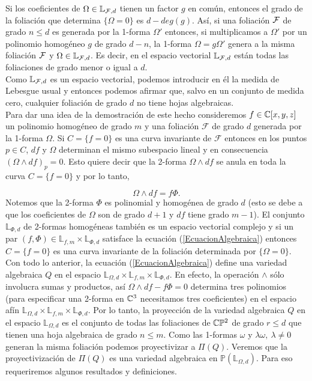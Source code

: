 Si los coeficientes de $\Omega\in\mathbb{L}_{\mathcal{F},d}$ tienen un factor $g$ en común, entonces el grado de la foliación que determina $\{\Omega =0\}$ es $d-deg(g)$. Así, si una foliación $\mathcal{F}$ de grado $n\leq d$ es generada por la 1-forma $\Omega'$ entonces, si multiplicamos a $\Omega'$ por un polinomio homogéneo $g$ de grado $d-n$, la 1-forma $\Omega=g\Omega'$ genera a la misma foliación $\mathcal{F}$ y $\Omega\in\mathbb{L}_{\mathcal{F},d}$. Es decir, en el espacio vectorial $\mathbb{L}_{\mathcal{F},d}$ están todas las foliaciones de grado menor o igual a $d$.\\

Como $\mathbb{L}_{\mathcal{F},d}$ es un espacio vectorial, podemos introducir en él la medida de Lebesgue usual y entonces podemos afirmar que, salvo en un conjunto de medida cero, cualquier foliación de grado $d$ no tiene hojas algebraicas.\\

Para dar una idea de la demostración de este hecho consideremos $f\in\mathbb{C}[x,y,z]$ un polinomio homogéneo  de grado $m$  y una foliación $\mathcal{F}$ de grado $d$ generada por la 1-forma $\Omega$. Si $C=\{f=0\}$ es una curva invariante de $\mathcal{F}$ entonces en los puntos $p\in C$, $df$ y $\Omega$ determinan el mismo subespacio lineal y en consecuencia $(\Omega\wedge df)_{p}=0$. Esto quiere decir que la 2-forma $\Omega\wedge df$ se anula en toda la curva $C=\{f=0\}$ y por lo tanto,

\begin{equation}
\label{EcuacionAlgebraica} 
\Omega\wedge df=f\Phi.
\end{equation}
\noindent Notemos que la 2-forma $\Phi$ es polinomial y homogénea de grado $d$ (esto se debe a que los coeficientes de $\Omega$ son de grado $d+1$ y $df$ tiene grado $m-1$). El conjunto $\mathbb{L}_{\Phi,d}$ de 2-formas homogéneas también es un espacio vectorial complejo y si un par $(f,\Phi)\in\mathbb{L}_{f,m}\times\mathbb{L}_{\Phi,d}$ satisface la ecuación (\ref{EcuacionAlgebraica}) entonces $C=\{f=0\}$ es una curva invariante de la foliación determinada por $\{\Omega=0\}$.\\

Con todo lo anterior, la ecuación (\ref{EcuacionAlgebraica}) define una variedad algebraica $Q$ en el espacio $\mathbb{L}_{\Omega,d}\times\mathbb{L}_{f,m}\times\mathbb{L}_{\Phi,d}$. En efecto, la operación $\wedge$ sólo involucra sumas y productos, así $\Omega\wedge df-f\Phi=0$ determina tres polinomios (para especificar una 2-forma en $\mathbb{C}^{3}$ necesitamos tres coeficientes) en el espacio afín $\mathbb{L}_{\Omega,d}\times\mathbb{L}_{f,m}\times\mathbb{L}_{\Phi,d}$. Por lo tanto, la proyección de la variedad algebraica $Q$ en el espacio $\mathbb{L}_{\Omega,d}$ es el conjunto de todas las foliaciones de $\mathbb{C}\mathbb{P}^2$ de grado $r\leq d$ que tienen una hoja algebraica de grado $n\leq m$. Como las 1-formas $\omega$ y $\lambda\omega,\ \lambda\neq 0$ generan la misma foliación podemos proyectivizar a $\Pi(Q)$. Veremos que la proyectivización de $\Pi(Q)$ es una variedad algebraica en $\mathbb{P}(\mathbb{L}_{\Omega,d})$. Para eso requeriremos algunos resultados y definiciones. \\


